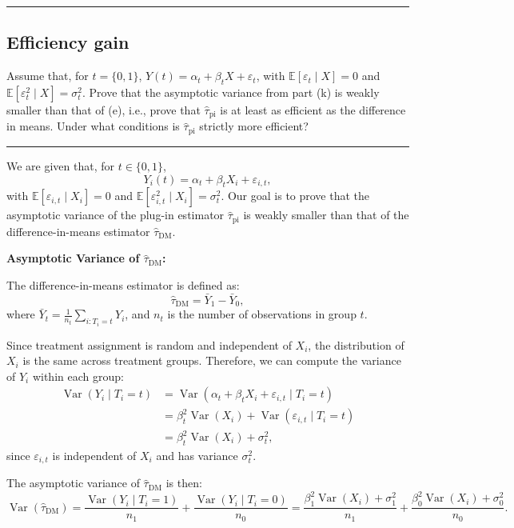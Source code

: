 \documentclass{article}
\newenvironment{colorparagraph}[1]{\par\color{#1}}{\par}
\begin{document}
\begin{colorparagraph}{questioncolor}
\rule{\textwidth}{0.5pt}

\label{q2l}\subsection{Efficiency gain}
Assume that, for \(t = \{0, 1\}\), \(Y(t) = \alpha_t + \beta_t X + \varepsilon_t\), with \(\mathbb{E}[\varepsilon_t \mid X] = 0\) and \(\mathbb{E}[\varepsilon_t^2 \mid X] = \sigma_t^2\). Prove that the asymptotic variance from part (k) is weakly smaller than that of (e), i.e., prove that \(\hat{\tau}_{\text{pi}}\) is at least as efficient as the difference in means. Under what conditions is \(\hat{\tau}_{\text{pi}}\) strictly more efficient?

\rule{\textwidth}{0.5pt}
\end{colorparagraph}

We are given that, for $t \in \{0, 1\}$,
\[
Y_i(t) = \alpha_t + \beta_t X_i + \varepsilon_{i,t},
\]
with $\mathbb{E}[\varepsilon_{i,t} \mid X_i] = 0$ and $\mathbb{E}[\varepsilon_{i,t}^2 \mid X_i] = \sigma_t^2$. Our goal is to prove that the asymptotic variance of the plug-in estimator $\hat{\tau}_{\text{pi}}$ is weakly smaller than that of the difference-in-means estimator $\hat{\tau}_{\text{DM}}$.

\textbf{Asymptotic Variance of $\hat{\tau}_{\text{DM}}$:}

The difference-in-means estimator is defined as:
\[
\hat{\tau}_{\text{DM}} = \bar{Y}_1 - \bar{Y}_0,
\]
where $\bar{Y}_t = \frac{1}{n_t} \sum_{i:T_i = t} Y_i$, and $n_t$ is the number of observations in group $t$.

Since treatment assignment is random and independent of $X_i$, the distribution of $X_i$ is the same across treatment groups. Therefore, we can compute the variance of $Y_i$ within each group:
\begin{align*}
\operatorname{Var}(Y_i \mid T_i = t) &= \operatorname{Var}(\alpha_t + \beta_t X_i + \varepsilon_{i,t} \mid T_i = t) \\
&= \beta_t^2 \operatorname{Var}(X_i) + \operatorname{Var}(\varepsilon_{i,t} \mid T_i = t) \\
&= \beta_t^2 \operatorname{Var}(X_i) + \sigma_t^2,
\end{align*}
since $\varepsilon_{i,t}$ is independent of $X_i$ and has variance $\sigma_t^2$.

The asymptotic variance of $\hat{\tau}_{\text{DM}}$ is then:
\[
\operatorname{Var}(\hat{\tau}_{\text{DM}}) = \frac{\operatorname{Var}(Y_i \mid T_i = 1)}{n_1} + \frac{\operatorname{Var}(Y_i \mid T_i = 0)}{n_0} = \frac{\beta_1^2 \operatorname{Var}(X_i) + \sigma_1^2}{n_1} + \frac{\beta_0^2 \operatorname{Var}(X_i) + \sigma_0^2}{n_0}.
\]
\end{document}
